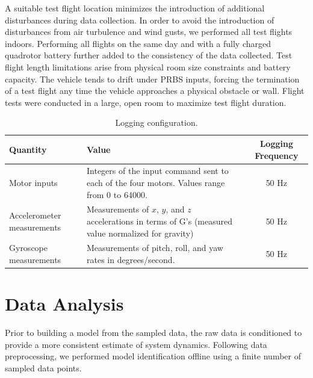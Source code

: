A suitable test flight location minimizes the introduction of additional disturbances during data collection. In order to avoid the introduction of disturbances from air turbulence and wind gusts, we performed all test flights indoors. Performing all flights on the same day and with a fully charged quadrotor battery further added to the consistency of the data collected. Test flight length limitations arise from physical room size constraints and battery capacity. The vehicle tends to drift under PRBS inputs, forcing the termination of a test flight any time the vehicle approaches a physical obstacle or wall. Flight tests were conducted in a large, open room to maximize test flight duration. 
\begin{table}[!htb]
\centering
\caption{Logging configuration.}
\begin{tabular}{p{7em}p{17em}c}
\toprule
Quantity & Value & Logging Frequency\\
\midrule
Motor inputs & Integers of the input command sent to each of the four motors. Values range from 0 to 64000. & 50 Hz \\[5em]
Accelerometer measurements & Measurements of $x$, $y$, and $z$ accelerations in terms of G's (measured value normalized for gravity) & 50 Hz\\[3em]
Gyroscope \hspace{2em}measurements & Measurements of pitch, roll, and yaw rates in degrees/second. & 50 Hz\\
\bottomrule
\end{tabular}
\end{table}



\section{Data Analysis}
Prior to building a model from the sampled data, the raw data is conditioned to provide a more consistent estimate of system dynamics. Following data preprocessing, we performed model identification offline using a finite number of sampled data points.


